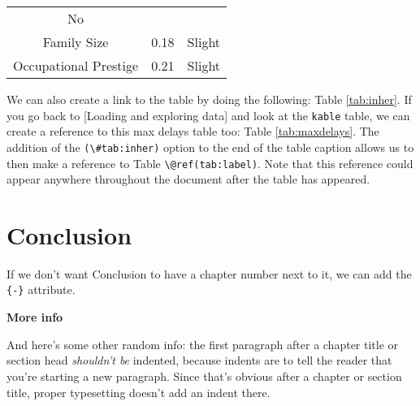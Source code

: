 \documentclass [11pt, proquest] {uwthesis}[2015/03/03]
\begin{document}
\begin{longtable}[]{@{}ccc@{}}
\begin{minipage}[t]{0.16\columnwidth}
No\strut
\end{minipage}\tabularnewline
\begin{minipage}[t]{0.29\columnwidth}\centering\strut
Family Size\strut
\end{minipage} & \begin{minipage}[t]{0.47\columnwidth}\centering\strut
0.18\strut
\end{minipage} & \begin{minipage}[t]{0.16\columnwidth}\centering\strut
Slight\strut
\end{minipage}\tabularnewline
\begin{minipage}[t]{0.29\columnwidth}\centering\strut
Occupational Prestige\strut
\end{minipage} & \begin{minipage}[t]{0.47\columnwidth}\centering\strut
0.21\strut
\end{minipage} & \begin{minipage}[t]{0.16\columnwidth}\centering\strut
Slight\strut
\end{minipage}\tabularnewline
\bottomrule
\end{longtable}
We can also create a link to the table by doing the following: Table
\ref{tab:inher}. If you go back to {[}Loading and exploring data{]} and
look at the \texttt{kable} table, we can create a reference to this max
delays table too: Table \ref{tab:maxdelays}. The addition of the
\texttt{(\textbackslash{}\#tab:inher)} option to the end of the table
caption allows us to then make a reference to Table
\texttt{\textbackslash{}@ref(tab:label)}. Note that this reference could
appear anywhere throughout the document after the table has appeared.

\chapter*{Conclusion}\label{conclusion}

If we don't want Conclusion to have a chapter number next to it, we can
add the \texttt{\{-\}} attribute.

\textbf{More info}

And here's some other random info: the first paragraph after a chapter
title or section head \emph{shouldn't be} indented, because indents are
to tell the reader that you're starting a new paragraph. Since that's
obvious after a chapter or section title, proper typesetting doesn't add
an indent there.

\appendix
\end{document}
